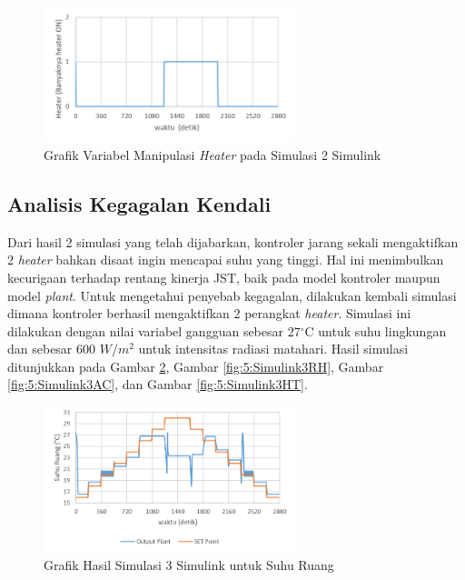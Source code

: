 \begin{figure}[!h]
	\centering
	\includegraphics[width=0.65\textwidth]{figures/Simulink2HT}
	\caption{Grafik Variabel Manipulasi \textit{Heater} pada Simulasi 2 Simulink}
	\label{fig:5:Simulink2HT}
\end{figure}
\break
\subsection{Analisis Kegagalan Kendali}

Dari hasil 2 simulasi yang telah dijabarkan, kontroler jarang sekali mengaktifkan 2 \textit{heater} bahkan disaat ingin mencapai suhu yang tinggi. Hal ini menimbulkan kecurigaan terhadap rentang kinerja JST, baik pada model kontroler maupun model \textit{plant}. Untuk mengetahui penyebab kegagalan, dilakukan kembali simulasi dimana kontroler berhasil mengaktifkan 2 perangkat \textit{heater}. Simulasi ini dilakukan dengan nilai variabel gangguan sebesar 27$^\circ$C untuk suhu lingkungan dan sebesar 600 $W/m^2$ untuk intensitas radiasi matahari. Hasil simulasi ditunjukkan pada Gambar \ref{fig:5:Simulink3Td}, Gambar \ref{fig:5:Simulink3RH}, Gambar \ref{fig:5:Simulink3AC}, dan Gambar \ref{fig:5:Simulink3HT}.

\begin{figure}[!h]
	\centering
	\includegraphics[width=0.65\textwidth]{figures/Simulink3Td}
	\caption{Grafik Hasil Simulasi 3 Simulink untuk Suhu Ruang}
	\label{fig:5:Simulink3Td}
\end{figure}

